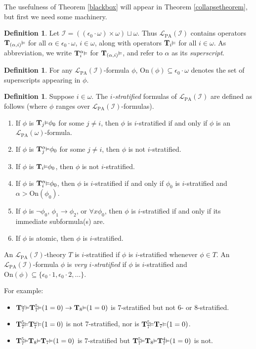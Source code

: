 \documentclass[reqno]{article}
\theoremstyle{definition}
\newtheorem{definition}[theorem]{Definition}
\def\L{\mathscr{L}}
\def\T{\mathbf{T}}
\def\LPA{\L_{\mathrm{PA}}}
\def\epom{\epsilon_0\cdot\omega}
\def\indset{\mathcal I}
\def\onset{\mathrm{On}}
\renewcommand{\Pr}[1]{\T_{#1}\mbox{\small${\vDash}$}}
\newcommand{\Prr}[2]{\T^{#1}_{#2}\mbox{\small${\vDash}$}}
\begin{document}
The usefulness of Theorem \ref{blackbox} will appear
in Theorem \ref{collapsetheorem}, but first we need some machinery.


\begin{definition}
Let $\indset=((\epom)\times\omega)\sqcup\omega$.
Thus $\LPA(\indset)$ contains operators $\Pr{(\alpha,i)}$ for all $\alpha\in\epom$, $i\in\omega$,
along with operators $\Pr{i}$ for all $i\in\omega$.
As abbreviation,
we write $\Prr{\alpha}{i}$ for $\Pr{(\alpha,i)}$,
and refer to $\alpha$ as its \emph{superscript}.
\end{definition}

\begin{definition}
For any $\LPA(\indset)$-formula $\phi$, $\onset(\phi)\subseteq\epom$ denotes
the set of superscripts appearing in $\phi$.
\end{definition}

\begin{definition}
\label{IStratifiedDefinition}
Suppose $i\in\omega$.
The \emph{$i$-stratified} formulas of $\LPA(\indset)$ are defined as follows (where $\phi$ ranges over $\LPA(\indset)$-formulas).
\begin{enumerate}
\item If $\phi$ is $\Pr j\phi_0$ for some $j\not=i$, then $\phi$ is $i$-stratified if and only if $\phi$ is an $\LPA(\omega)$-formula.
\item If $\phi$ is $\Prr\alpha j\phi_0$ for some $j\not=i$, then $\phi$ is not $i$-stratified.
\item If $\phi$ is $\Pr i\phi_0$, then $\phi$ is not $i$-stratified.
\item If $\phi$ is $\Prr\alpha i\phi_0$, then $\phi$ is $i$-stratified if and only if $\phi_0$ is $i$-stratified and
$\alpha>\onset(\phi_0)$.
\item If $\phi$ is $\neg\phi_0$, $\phi_1\rightarrow\phi_2$, or $\forall x\phi_0$,
then $\phi$ is $i$-stratified if and only if its immediate subformula(s) are.
\item If $\phi$ is atomic, then $\phi$ is $i$-stratified.
\end{enumerate}
An $\LPA(\indset)$-theory $T$ is $i$-stratified if $\phi$ is $i$-stratified whenever $\phi\in T$.
An $\LPA(\indset)$-formula $\phi$ is \emph{very $i$-stratified} if $\phi$ is $i$-stratified
and $\onset(\phi)\subseteq\{\epsilon_0\cdot 1,\epsilon_0\cdot 2,\ldots\}$.
\end{definition}

For example:
\begin{itemize}
\item $\Prr{\omega}7 \Prr 5 7(1=0)\rightarrow \Pr 8(1=0)$ is $7$-stratified but not $6$- or $8$-stratified.
\item $\Prr 5 7 \Prr\omega 7(1=0)$ is not $7$-stratified, nor is $\Prr 5 7 \Pr 7(1=0)$.
\item $\Prr 5 7 \Pr 8 \Pr 7(1=0)$ is $7$-stratified but $\Prr 5 7 \Pr 8 \Prr 4 7(1=0)$ is not.
\end{itemize}
\end{document}
